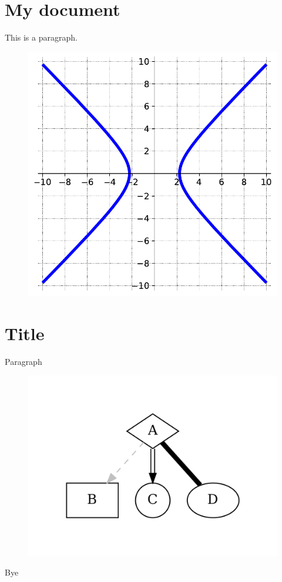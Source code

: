\section{My document}\label{my-document}

This is a paragraph.

\begin{figure}
\centering
\includegraphics{plots/pandocplot13747395039291759549.pdf}
\caption{}
\end{figure}

\section{Title}\label{title}

Paragraph

\begin{figure}
\centering
\includegraphics{plots/pandocplot466053955683818097.pdf}
\caption{}
\end{figure}

Bye
